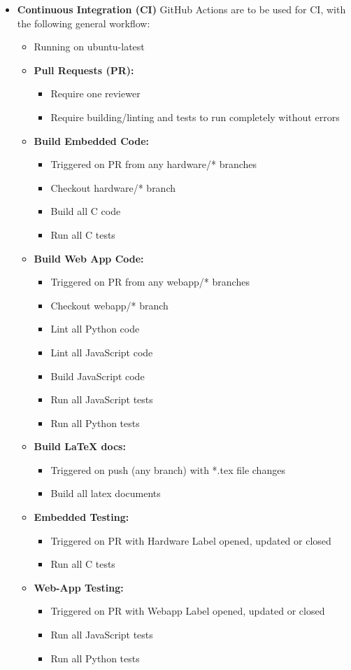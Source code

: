 \documentclass{article}
\begin{document}
\begin{itemize}
\item \textbf{Continuous Integration (CI)} GitHub Actions are to be used for CI, with the following general workflow:
\begin{itemize}
    \item Running on ubuntu-latest
    \item \textbf{Pull Requests (PR):} 
    \begin{itemize}
        \item Require one reviewer
        \item Require building/linting and tests to run completely without errors
    \end{itemize}
    \item \textbf{Build Embedded Code:}
    \begin{itemize}
        \item Triggered on PR from any hardware/* branches
        \item Checkout hardware/* branch
        \item Build all C code
        \item Run all C tests
    \end{itemize}
    \item \textbf{Build Web App Code:} 
    \begin{itemize}
        \item Triggered on PR from any webapp/* branches
        \item Checkout webapp/* branch
        \item Lint all Python code
        \item Lint all JavaScript code
        \item Build JavaScript code
        \item Run all JavaScript tests
        \item Run all Python tests
    \end{itemize}
    \item \textbf{Build LaTeX docs:} 
    \begin{itemize}
        \item Triggered on push (any branch) with *.tex file changes
        \item Build all latex documents
    \end{itemize}
    \item \textbf{Embedded Testing:} 
    \begin{itemize}
        \item Triggered on PR with Hardware Label opened, updated or closed
        \item Run all C tests
    \end{itemize}
    \item \textbf{Web-App Testing:} 
    \begin{itemize}
        \item Triggered on PR with Webapp Label opened, updated or closed
        \item Run all JavaScript tests
        \item Run all Python tests
    \end{itemize}


\end{itemize}
\end{itemize}
\end{document}
